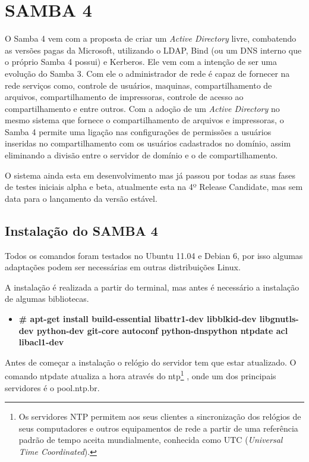 \chapter{SAMBA 4}

O Samba 4 vem com a proposta de criar um \textit{Active Directory} livre, combatendo as versões pagas da Microsoft, utilizando o LDAP, Bind (ou um DNS interno que o próprio Samba 4 possui) e Kerberos. Ele vem com a intenção de ser uma evolução do Samba 3. Com ele o administrador de rede é capaz de fornecer na rede serviços como, controle de usuários, maquinas, compartilhamento de arquivos, compartilhamento de impressoras, controle de acesso ao compartilhamento e entre outros.
Com a adoção de um \textit{Active Directory} no mesmo sistema que fornece o compartilhamento de arquivos e impressoras, o Samba 4 permite uma ligação nas configurações de permissões a usuários inseridas no compartilhamento com os usuários cadastrados no domínio, assim eliminando a divisão entre o servidor de domínio e o de compartilhamento.

O sistema ainda esta em desenvolvimento mas já passou por todas as suas fases de testes iniciais alpha e beta, atualmente esta na 4º Release Candidate, mas sem data para o lançamento da versão estável.

\section{Instalação do SAMBA 4}

Todos os comandos foram testados no Ubuntu 11.04 e Debian 6, por isso algumas adaptações podem ser necessárias em outras distribuições Linux.

A instalação é realizada a partir do terminal, mas antes é necessário a instalação de algumas bibliotecas.

\begin{itemize}
	\item \textbf{\# apt-get install build-essential libattr1-dev libblkid-dev libgnutls-dev python-dev git-core autoconf python-dnspython ntpdate acl libacl1-dev}
\end{itemize}

Antes de começar a instalação o relógio do servidor tem que estar atualizado. O comando ntpdate atualiza a hora através do  ntp\footnote[2]{Os servidores NTP permitem aos seus clientes a sincronização dos relógios de seus computadores e outros equipamentos de rede a partir de uma referência padrão de tempo aceita mundialmente, conhecida como UTC (\textit{Universal Time Coordinated}).\cite{RNP}} , onde um dos principais servidores é o pool.ntp.br.

